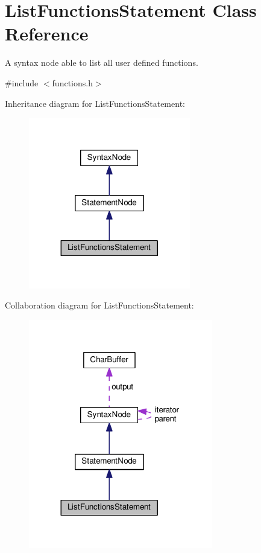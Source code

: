 \hypertarget{classListFunctionsStatement}{}\section{List\+Functions\+Statement Class Reference}
\label{classListFunctionsStatement}


A syntax node able to list all user defined functions.  




{\ttfamily \#include $<$functions.\+h$>$}



Inheritance diagram for List\+Functions\+Statement\+:\nopagebreak
\begin{figure}[H]
\begin{center}
\leavevmode
\includegraphics[width=200pt]{classListFunctionsStatement__inherit__graph}
\end{center}
\end{figure}


Collaboration diagram for List\+Functions\+Statement\+:\nopagebreak
\begin{figure}[H]
\begin{center}
\leavevmode
\includegraphics[width=228pt]{classListFunctionsStatement__coll__graph}
\end{center}
\end{figure}
